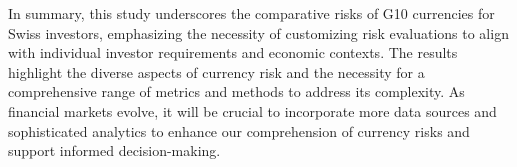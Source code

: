 \documentclass[11pt,a4paper,english,oneside]{book}
\begin{document}
In summary, this study underscores the comparative risks of G10 currencies for Swiss investors, emphasizing the necessity of customizing risk evaluations to align with individual investor requirements and economic contexts. The results highlight the diverse aspects of currency risk and the necessity for a comprehensive range of metrics and methods to address its complexity. As financial markets evolve, it will be crucial to incorporate more data sources and sophisticated analytics to enhance our comprehension of currency risks and support informed decision-making.

\printbibliography
\end{document}
